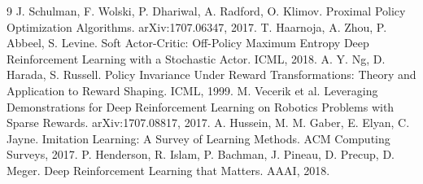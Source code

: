\documentclass[10pt,twocolumn]{article}
\begin{document}
\begin{thebibliography}{9}
\small
{} J. Schulman, F. Wolski, P. Dhariwal, A. Radford, O. Klimov. Proximal Policy Optimization Algorithms. arXiv:1707.06347, 2017.
 T. Haarnoja, A. Zhou, P. Abbeel, S. Levine. Soft Actor-Critic: Off-Policy Maximum Entropy Deep Reinforcement Learning with a Stochastic Actor. ICML, 2018.
 A. Y. Ng, D. Harada, S. Russell. Policy Invariance Under Reward Transformations: Theory and Application to Reward Shaping. ICML, 1999.
 M. Vecerik et al. Leveraging Demonstrations for Deep Reinforcement Learning on Robotics Problems with Sparse Rewards. arXiv:1707.08817, 2017.
 A. Hussein, M. M. Gaber, E. Elyan, C. Jayne. Imitation Learning: A Survey of Learning Methods. ACM Computing Surveys, 2017.
 P. Henderson, R. Islam, P. Bachman, J. Pineau, D. Precup, D. Meger. Deep Reinforcement Learning that Matters. AAAI, 2018.
\end{thebibliography}
\end{document}

